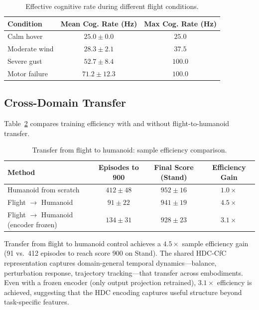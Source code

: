 \documentclass[11pt,a4paper]{article}
\begin{document}
\begin{table}[h]
\centering
\caption{Effective cognitive rate during different flight conditions.}
\label{tab:cograte}
\begin{tabular}{lcc}
\toprule
\textbf{Condition} & \textbf{Mean Cog. Rate (Hz)} & \textbf{Max Cog. Rate (Hz)} \\
\midrule
Calm hover      & $25.0 \pm 0.0$ & $25.0$ \\
Moderate wind   & $28.3 \pm 2.1$ & $37.5$ \\
Severe gust     & $52.7 \pm 8.4$ & $100.0$ \\
Motor failure   & $71.2 \pm 12.3$ & $100.0$ \\
\bottomrule
\end{tabular}
\end{table}

\subsection{Cross-Domain Transfer}

Table~\ref{tab:transfer} compares training efficiency with and without flight-to-humanoid transfer.

\begin{table}[h]
\centering
\caption{Transfer from flight to humanoid: sample efficiency comparison.}
\label{tab:transfer}
\begin{tabular}{lccc}
\toprule
\textbf{Method} & \textbf{Episodes to 900} & \textbf{Final Score (Stand)} & \textbf{Efficiency Gain} \\
\midrule
Humanoid from scratch    & $412 \pm 48$ & $952 \pm 16$ & $1.0\times$ \\
Flight $\to$ Humanoid    & $91 \pm 22$  & $941 \pm 19$ & $4.5\times$ \\
Flight $\to$ Humanoid (encoder frozen) & $134 \pm 31$ & $928 \pm 23$ & $3.1\times$ \\
\bottomrule
\end{tabular}
\end{table}

Transfer from flight to humanoid control achieves a $4.5\times$ sample efficiency gain (91 vs.\ 412 episodes to reach score 900 on Stand).
The shared HDC-CfC representation captures domain-general temporal dynamics---balance, perturbation response, trajectory tracking---that transfer across embodiments.
Even with a frozen encoder (only output projection retrained), $3.1\times$ efficiency is achieved, suggesting that the HDC encoding captures useful structure beyond task-specific features.
\end{document}

